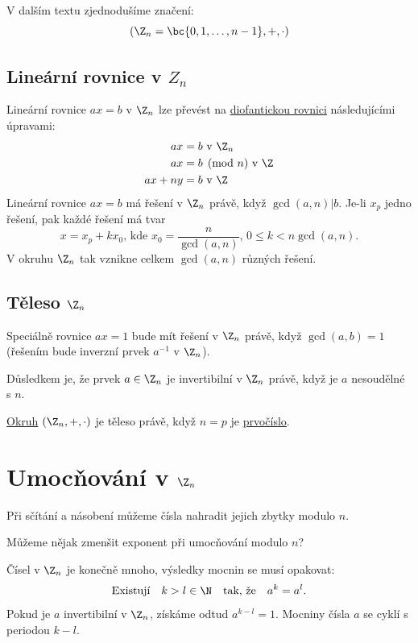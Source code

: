 V dalším textu zjednodušíme značení:
\[
	(\Z_n = \bc{0, 1, \dots, n-1}, +, \cdot)	
\]

\subsection{Lineární rovnice v \texorpdfstring{$Z_n$}{Zn}}
Lineární rovnice $ax = b$ v $\Z_n$ lze převést na \hyperref[diofantRce]{diofantickou rovnici} následujícími úpravami:
\begin{align}
	ax &= b \text{ v } \Z_n \\
	ax &= b \pmod{n} \text{ v } \Z \\
	ax + ny &=b \text{ v } \Z
\end{align}
Lineární rovnice $ax = b$ má řešení v $\Z_n$ právě, když $\gcd(a,n) | b$. Je-li $x_p$ jedno řešení, pak každé řešení má tvar
\begin{equation}
	x = x_p + k x_0, \, \text{kde } x_0 = \frac{n}{\gcd(a,n)}, \, 0 \leq k < n \gcd(a,n).
\end{equation}
V okruhu $\Z_n$ tak vznikne celkem $\gcd(a,n)$ různých řešení.

\subsection{Těleso \texorpdfstring{$\Z_n$}{Zn}}
Speciálně rovnice $ax = 1$ bude mít řešení v $\Z_n$ právě, když $\gcd(a,b)=1$ (řešením bude inverzní prvek $a^{-1}$ v $\Z_n$).

Důsledkem je, že prvek $a \in \Z_n$ je invertibilní v $\Z_n$ právě, když je $a$ nesoudělné s $n$.

\hyperref[okruh]{Okruh} $(\Z_n, +, \cdot)$ je těleso právě, když $n=p$ je \hyperref[prvocisla]{prvočíslo}.

\section*{Umocňování v $\Z_n$}
Při sčítání a násobení můžeme čísla nahradit jejich zbytky modulo $n$.

Můžeme nějak zmenšit exponent při umocňování modulo $n$?

Čísel v $\Z_n$ je konečně mnoho, výsledky mocnin se musí opakovat:
\begin{equation}
	\text{Existují} \quad k > l \in \N \quad \text{tak, že} \quad a^k = a^l.
\end{equation}
Pokud je $a$ invertibilní v $\Z_n$, získáme odtud $a^{k-l} = 1$. Mocniny čísla $a$ se cyklí s periodou $k-l$.

